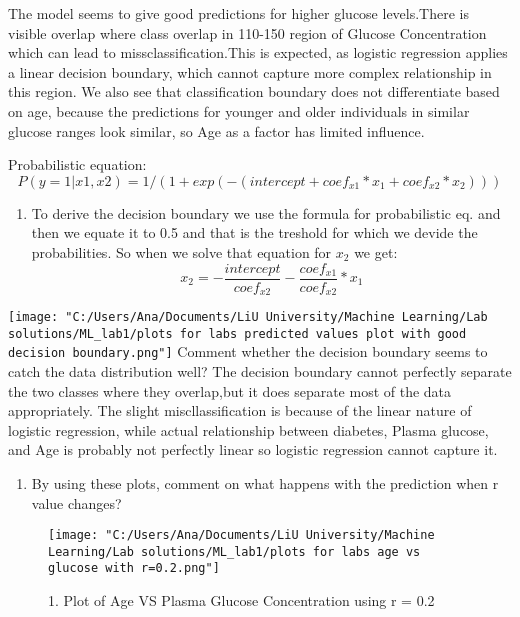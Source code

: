\documentclass[
]{article}
\providecommand{\tightlist}{%
  \setlength{\itemsep}{0pt}\setlength{\parskip}{0pt}}
\begin{document}
The model seems to give good predictions for higher glucose levels.There
is visible overlap where class overlap in 110-150 region of Glucose
Concentration which can lead to missclassification.This is expected, as
logistic regression applies a linear decision boundary, which cannot
capture more complex relationship in this region. We also see that
classification boundary does not differentiate based on age, because the
predictions for younger and older individuals in similar glucose ranges
look similar, so Age as a factor has limited influence.

Probabilistic equation:
\[P(y = 1 | x1, x2) = 1 / (1 + exp(-(intercept + coef_{x1} * x_1 + coef_{x2} * x_2)))\]

\begin{enumerate}
\def\labelenumi{\arabic{enumi}.}
\setcounter{enumi}{2}
\tightlist
\item
  To derive the decision boundary we use the formula for probabilistic
  eq. and then we equate it to 0.5 and that is the treshold for which we
  devide the probabilities. So when we solve that equation for \(x_2\)
  we get:
  \[x_2 = - \frac{intercept}{coef_{x2}} - \frac{coef_{x1}}{coef_{x2}} * x_1\]
\end{enumerate}

\texttt{[image: "C:/Users/Ana/Documents/LiU University/Machine Learning/Lab solutions/ML\_lab1/plots for labs predicted values plot with good decision boundary.png"]}
Comment whether the decision boundary seems to catch the data
distribution well? The decision boundary cannot perfectly separate the
two classes where they overlap,but it does separate most of the data
appropriately. The slight miscllassification is because of the linear
nature of logistic regression, while actual relationship between
diabetes, Plasma glucose, and Age is probably not perfectly linear so
logistic regression cannot capture it.

\begin{enumerate}
\def\labelenumi{\arabic{enumi}.}
\setcounter{enumi}{3}
\tightlist
\item
  By using these plots, comment on what happens with the prediction when
  r value changes?
\end{enumerate}

\begin{figure}
\centering
\texttt{[image: "C:/Users/Ana/Documents/LiU University/Machine Learning/Lab solutions/ML\_lab1/plots for labs age vs glucose with r=0.2.png"]}
\caption{1. Plot of Age VS Plasma Glucose Concentration using r = 0.2}
\end{figure}
\end{document}
